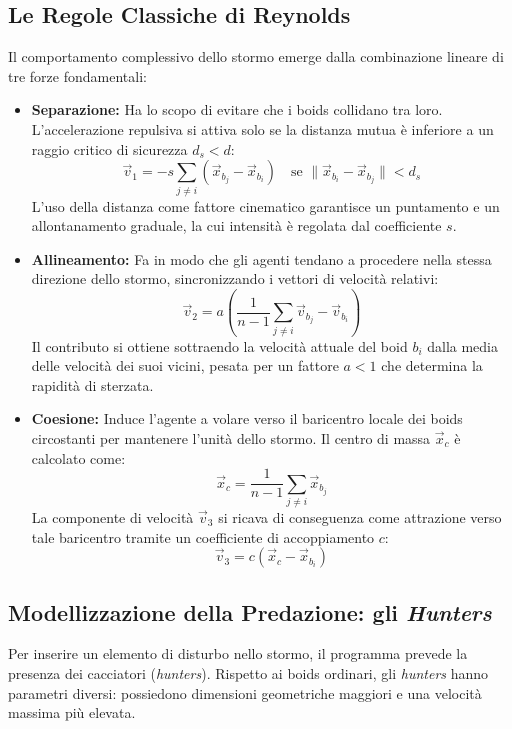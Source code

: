 \documentclass[11pt, a4paper]{article}
\begin{document}
\subsection{Le Regole Classiche di Reynolds}
Il comportamento complessivo dello stormo emerge dalla combinazione lineare di tre forze fondamentali:
\begin{itemize}
    \item \textbf{Separazione:} Ha lo scopo di evitare che i boids collidano tra loro. L'accelerazione repulsiva si attiva solo se la distanza mutua è inferiore a un raggio critico di sicurezza $d_s < d$:
    \begin{equation}
        \vec{v}_1 = -s \sum_{j \neq i} (\vec{x}_{b_j} - \vec{x}_{b_i}) \quad \text{se } \lVert \vec{x}_{b_i} - \vec{x}_{b_j} \rVert < d_s
    \end{equation}
    L'uso della distanza come fattore cinematico garantisce un puntamento e un allontanamento graduale, la cui intensità è regolata dal coefficiente $s$.
    
    \item \textbf{Allineamento:} Fa in modo che gli agenti tendano a procedere nella stessa direzione dello stormo, sincronizzando i vettori di velocità relativi:
    \begin{equation}
        \vec{v}_2 = a \left( \frac{1}{n-1} \sum_{j \neq i} \vec{v}_{b_j} - \vec{v}_{b_i} \right)
    \end{equation}
    Il contributo si ottiene sottraendo la velocità attuale del boid $b_i$ dalla media delle velocità dei suoi vicini, pesata per un fattore $a < 1$ che determina la rapidità di sterzata.
    
    \item \textbf{Coesione:} Induce l'agente a volare verso il baricentro locale dei boids circostanti per mantenere l'unità dello stormo. Il centro di massa $\vec{x}_c$ è calcolato come:
    \begin{equation}
        \vec{x}_c = \frac{1}{n-1} \sum_{j \neq i} \vec{x}_{b_j}
    \end{equation}
    La componente di velocità $\vec{v}_3$ si ricava di conseguenza come attrazione verso tale baricentro tramite un coefficiente di accoppiamento $c$:
    \begin{equation}
        \vec{v}_3 = c (\vec{x}_c - \vec{x}_{b_i})
    \end{equation}
\end{itemize}

\subsection{Modellizzazione della Predazione: gli \textit{Hunters}}
Per inserire un elemento di disturbo nello stormo, il programma prevede la presenza dei cacciatori (\textit{hunters}). Rispetto ai boids ordinari, gli \textit{hunters} hanno parametri diversi: possiedono dimensioni geometriche maggiori e una velocità massima più elevata.
\end{document}
